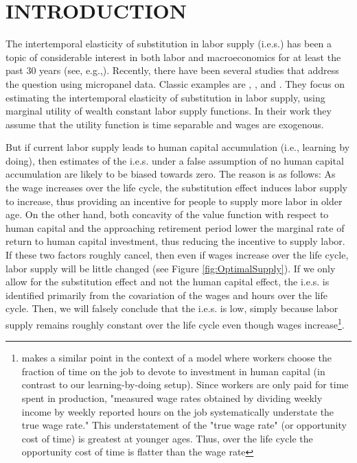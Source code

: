 \documentclass{article}
\begin{document}
\section{INTRODUCTION}
\label{section:intro}
\quad The intertemporal elasticity of substitution in labor supply (i.e.s.) has been a topic of considerable interest in both labor and macroeconomics for at least the past 30 years (see, e.g.,\cite{Lucas1969-ti}). Recently, there have been several studies that address the question using micropanel data. Classic examples are \cite{MaCurdy1981-iy}, \cite{Browning1985-ox}, and \cite{Altonji1986-zf}. They focus on estimating the intertemporal elasticity of substitution in labor supply, using marginal utility of wealth constant labor supply functions. In their work they assume that the utility function is time separable and wages are exogenous.\par
But if current labor supply leads to human capital accumulation (i.e., learning by doing), then estimates of the i.e.s. under a false assumption of no human capital accumulation are likely to be biased towards zero. The reason is as follows: As the wage increases over the life cycle, the substitution effect induces labor supply to increase, thus providing an incentive for people to supply more labor in older age. On the other hand, both concavity of the value function with respect to human capital and the approaching retirement period lower the marginal rate of return to human capital investment, thus reducing the incentive to supply labor. If these two factors roughly cancel, then even if wages increase over the life cycle, labor supply will be little changed (see Figure \ref{fig:OptimalSupply}). If we only allow for the substitution effect and not the human capital effect, the i.e.s. is identified primarily from the covariation of the wages and hours over the life cycle. Then, we will falsely conclude that the i.e.s. is low, simply because labor supply remains roughly constant over the life cycle even though wages increase\footnote[2]{ \cite{Heckman1976-lc} makes a similar point in the context of a model where workers choose the fraction of time on the job to devote to investment in human capital (in contrast to our learning-by-doing setup). Since workers are only paid for time spent in production, "measured wage rates obtained by dividing weekly income by weekly reported hours on the job systematically understate the true wage rate." This understatement of the "true wage rate" (or opportunity cost of time) is greatest at younger ages. Thus, over the life cycle the opportunity cost of time is flatter than the wage rate}. \par
\end{document}
